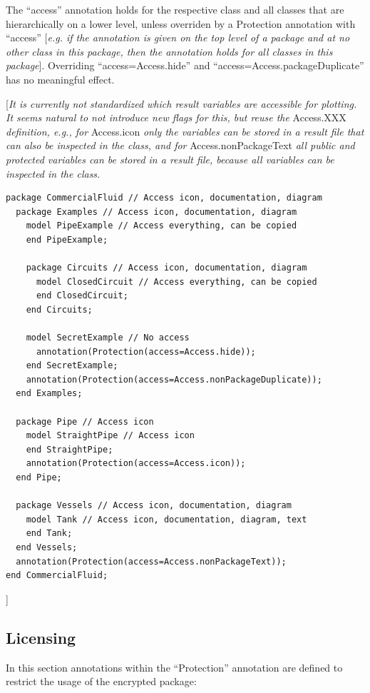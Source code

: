 \documentclass[10pt,a4paper]{report}
\def\doublelabel#1{\label{#1}\hypertarget{#1}{}}
\begin{document}
The ``access'' annotation holds for the respective class and all classes
that are hierarchically on a lower level, unless overriden by a
Protection annotation with ``access'' {[}\emph{e.g. if the annotation is
given on the top level of a package and at no other class in this
package, then the annotation holds for all classes in this package}{]}.
Overriding ``access=Access.hide'' and ``access=Access.packageDuplicate''
has no meaningful effect.

{[}\emph{It is currently not standardized which result variables are
accessible for plotting. It seems natural to not introduce new flags for
this, but reuse the} Access.XXX \emph{definition, e.g., for} Access.icon
\emph{only the variables can be stored in a result file that can also be
inspected in the class, and for} Access.nonPackageText \emph{all public
and protected variables can be stored in a result file, because all
variables can be inspected in the class.}

\begin{lstlisting}[language=modelica]
package CommercialFluid // Access icon, documentation, diagram
  package Examples // Access icon, documentation, diagram
    model PipeExample // Access everything, can be copied
    end PipeExample;

    package Circuits // Access icon, documentation, diagram
      model ClosedCircuit // Access everything, can be copied
      end ClosedCircuit;
    end Circuits;

    model SecretExample // No access
      annotation(Protection(access=Access.hide));
    end SecretExample;
    annotation(Protection(access=Access.nonPackageDuplicate));
  end Examples;

  package Pipe // Access icon
    model StraightPipe // Access icon
    end StraightPipe;
    annotation(Protection(access=Access.icon));
  end Pipe;

  package Vessels // Access icon, documentation, diagram
    model Tank // Access icon, documentation, diagram, text
    end Tank;
  end Vessels;
  annotation(Protection(access=Access.nonPackageText));
end CommercialFluid;
\end{lstlisting}
{]}

\subsection{Licensing}\doublelabel{licensing}

In this section annotations within the ``Protection'' annotation are
defined to restrict the usage of the encrypted package:
\end{document}
